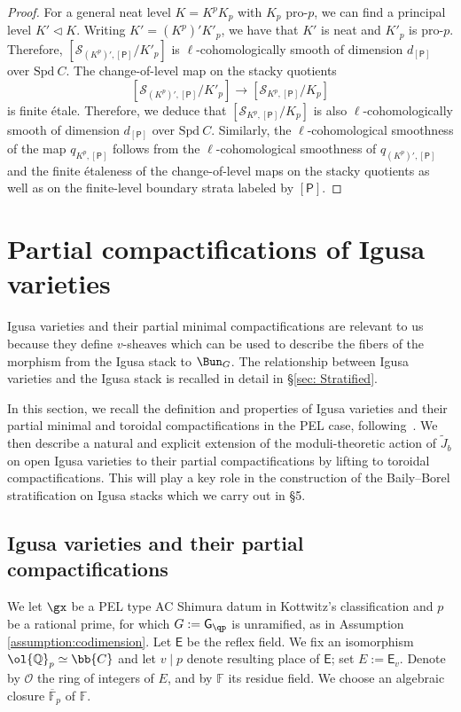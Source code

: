 \documentclass[letterpaper,11pt]{amsart}
\begin{document}
\begin{proof}
For a general neat level $K = K^pK_p$ with $K_p$ pro-$p$, we can find a principal level $K'\triangleleft K$. Writing $K' = (K^p)'K'_p$, we have that $K'$ is neat and $K'_p$ is pro-$p$. Therefore, $[\mathcal{S}_{(K^p)',[\mathsf{P}]}/K'_p]$ is $\ell$-cohomologically smooth of dimension $d_{[\mathsf{P}]}$ over $\mathrm{Spd}\ C$. The change-of-level map on the stacky quotients
\[
[\mathcal{S}_{(K^p)',[\mathsf{P}]}/K'_p]
\to 
[\mathcal{S}_{K^p,[\mathsf{P}]}/K_p]
\]
is finite \'etale. Therefore, we deduce that $[\mathcal{S}_{K^p,[\mathsf{P}]}/K_p]$ is also $\ell$-cohomologically smooth of dimension $d_{[\mathsf{P}]}$ over $\mathrm{Spd}\ C$. Similarly, the $\ell$-cohomological smoothness of the map $q_{K^p, [\mathsf{P}]}$ follows from the $\ell$-cohomological smoothness of $q_{(K^p)', [\mathsf{P}]}$ and the finite \'etaleness of the change-of-level maps on the stacky quotients as well as on the finite-level boundary strata labeled by $[\mathsf{P}]$.  
\end{proof}



\section{Partial compactifications of Igusa varieties}\label{sec: pc Igusa varieties}

Igusa varieties and their partial minimal compactifications are relevant to us because they define $v$-sheaves which can be used to describe the fibers of the morphism from the Igusa stack to $\Bun_{G}$. The relationship between Igusa varieties and the Igusa stack is recalled in detail in \S\ref{sec: Stratified}. 

In this section, we recall the definition and properties of Igusa varieties and their partial minimal and toroidal compactifications in the PEL case, following~\cite{CS17, CS2, santos}. We then describe a natural and explicit extension of the moduli-theoretic action of $\widetilde{J}_b$ on open Igusa varieties to their partial compactifications by lifting to toroidal compactifications. This will play a key role in the construction of the Baily--Borel stratification on Igusa stacks which we carry out in \S 5.

\subsection{Igusa varieties and their partial compactifications}\label{Sec:Igusa background}

We let $\gx$ be a PEL type AC Shimura datum in Kottwitz's classification and $p$ be a rational prime, for which $G:=\mathsf{G}_{\qp}$ is unramified, as in Assumption \ref{assumption:codimension}. Let  $\mathsf{E}$ be the reflex field. We fix an isomorphism $\ol{\mathbb{Q}}_{p} \simeq \bb{C}$ and let $v\mid p$ denote resulting place of $\mathsf{E}$; set $E:=\mathsf{E}_v$. Denote by $\mathcal{O}$ the ring of integers of $E$, and by $\mathbb{F}$ its residue field. We choose an algebraic closure $\overline{\mathbb{F}}_p$ of $\mathbb{F}$.
\end{document}
